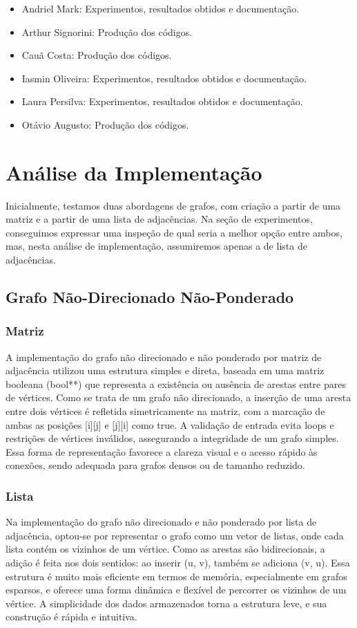 \documentclass{sbc2023}%
\begin{document}
\begin{itemize}
  \item  Andriel Mark: Experimentos, resultados obtidos e documentação.
  \item Arthur Signorini: Produção dos códigos.
  \item Cauã Costa: Produção dos códigos.
  \item Iasmin Oliveira: Experimentos, resultados obtidos e documentação.
  \item Laura Persilva: Experimentos, resultados obtidos e documentação.
  \item Otávio Augusto: Produção dos códigos.
\end{itemize}

 
\section{Análise da Implementação}

Inicialmente, testamos duas abordagens de grafos, com criação a partir de uma matriz e a partir de uma lista de adjacências. Na seção de experimentos, conseguimos expressar uma inspeção de qual seria a melhor opção entre ambos, mas, nesta análise de implementação, assumiremos apenas a de lista de adjacências.


\subsection{Grafo Não-Direcionado Não-Ponderado}
\subsubsection {Matriz}
A implementação do grafo não direcionado e não ponderado por matriz de adjacência utilizou uma estrutura simples e direta, baseada em uma matriz booleana (bool**) que representa a existência ou ausência de arestas entre pares de vértices. Como se trata de um grafo não direcionado, a inserção de uma aresta entre dois vértices é refletida simetricamente na matriz, com a marcação de ambas as posições [i][j] e [j][i] como true. A validação de entrada evita loops e restrições de vértices inválidos, assegurando a integridade de um grafo simples. Essa forma de representação favorece a clareza visual e o acesso rápido às conexões, sendo adequada para grafos densos ou de tamanho reduzido. 

\subsubsection {Lista}
Na implementação do grafo não direcionado e não ponderado por lista de adjacência, optou-se por representar o grafo como um vetor de listas, onde cada lista contém os vizinhos de um vértice. Como as arestas são bidirecionais, a adição é feita nos dois sentidos: ao inserir (u, v), também se adiciona (v, u). Essa estrutura é muito mais eficiente em termos de memória, especialmente em grafos esparsos, e oferece uma forma dinâmica e flexível de percorrer os vizinhos de um vértice. A simplicidade dos dados armazenados torna a estrutura leve, e sua construção é rápida e intuitiva.
\end{document}
